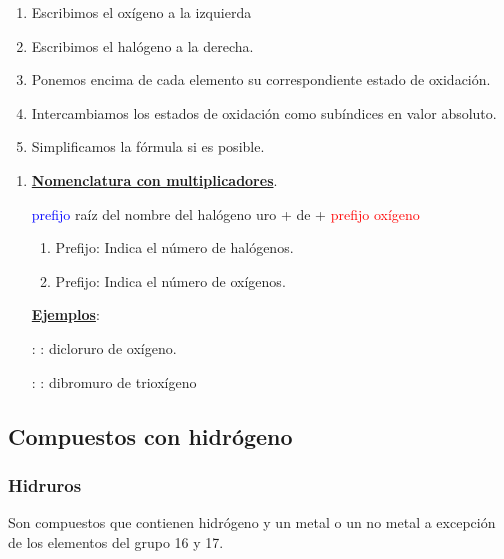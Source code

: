 \documentclass[11pt, a4paper]{article}
\begin{document}
\vspace*{2mm}
\begin{enumerate}[label=\itembolascolor{\arabic*}{green!50!black}]
    \item Escribimos el oxígeno a la izquierda
    \item Escribimos el halógeno a la derecha.
    \item Ponemos encima de cada elemento su correspondiente estado de oxidación.
    \item Intercambiamos los estados de oxidación como subíndices en valor absoluto.
    \item Simplificamos la fórmula si es posible.
\end{enumerate}


\begin{enumerate}[label=\itembolascolor{\arabic*}{blue}]
    \item \textbf{\uline{Nomenclatura con multiplicadores}}.
          \begin{center}
              \textcolor{blue}{prefijo} \textcolor{azulF}{raíz del nombre del halógeno} \textcolor{green!50!black}{uro} + de + \textcolor{red}{prefijo} \textcolor{red}{oxígeno}
          \end{center}

          \begin{enumerate}[label=\textcolor{red}{$\bullet$}]
              \item Prefijo: Indica el número de halógenos.
              \item Prefijo: Indica el número de oxígenos.
          \end{enumerate}

          \textbf{\uline{Ejemplos}}:

           : : dicloruro de oxígeno.

           : : dibromuro de trioxígeno
\end{enumerate}



\subsection{Compuestos con hidrógeno}

\subsubsection{Hidruros}\label{sec:hidruros}
Son compuestos que contienen hidrógeno y un metal o un no metal a excepción de los elementos del grupo 16 y 17.
\end{document}
